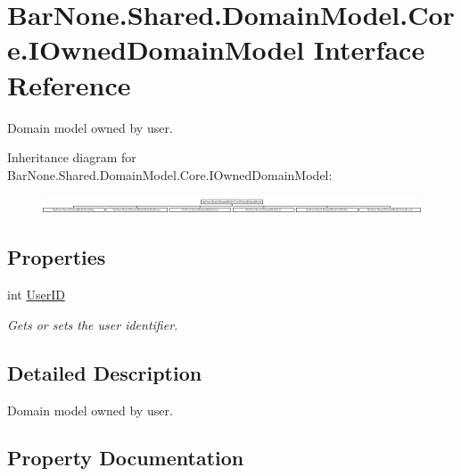 \hypertarget{interface_bar_none_1_1_shared_1_1_domain_model_1_1_core_1_1_i_owned_domain_model}{}\section{Bar\+None.\+Shared.\+Domain\+Model.\+Core.\+I\+Owned\+Domain\+Model Interface Reference}
\label{interface_bar_none_1_1_shared_1_1_domain_model_1_1_core_1_1_i_owned_domain_model}


Domain model owned by user.  


Inheritance diagram for Bar\+None.\+Shared.\+Domain\+Model.\+Core.\+I\+Owned\+Domain\+Model\+:\begin{figure}[H]
\begin{center}
\leavevmode
\includegraphics[height=0.530303cm]{interface_bar_none_1_1_shared_1_1_domain_model_1_1_core_1_1_i_owned_domain_model}
\end{center}
\end{figure}
\subsection*{Properties}
\begin{DoxyCompactItemize}
\item 
int \mbox{\hyperlink{interface_bar_none_1_1_shared_1_1_domain_model_1_1_core_1_1_i_owned_domain_model_a0537f80b680a91f90e568ab56d17ac55}{User\+ID}}
\begin{DoxyCompactList}\small\item\em Gets or sets the user identifier. \end{DoxyCompactList}\end{DoxyCompactItemize}


\subsection{Detailed Description}
Domain model owned by user. 



\subsection{Property Documentation}
\mbox{\label{interface_bar_none_1_1_shared_1_1_domain_model_1_1_core_1_1_i_owned_domain_model_a0537f80b680a91f90e568ab56d17ac55}} 
